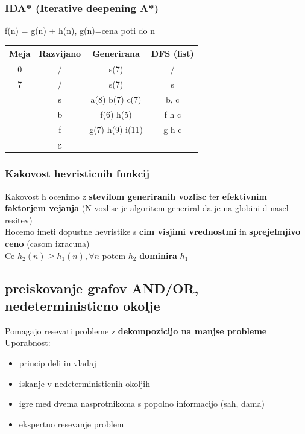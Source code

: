 \subsubsection{IDA* (Iterative deepening A*)}
f(n) = g(n) + h(n), g(n)=cena poti do n\\
\begin{tabular}{c|c|c|c}
    Meja & Razvijano & Generirana & DFS (list)\\
    \hline
    0 & / & s(7) & /\\
    \hline
    7 & / & s(7) & s \\
      & s & a(8) b(7) c(7) & b, c\\
      & b & f(6) h(5) & f h c\\
      & f & g(7) h(9) i(11) & g h c\\
      & \underline{g} &  & 
\end{tabular}



\subsubsection{Kakovost hevristicnih funkcij}

Kakovost h ocenimo z \textbf{stevilom generiranih vozlisc} ter \textbf{efektivnim faktorjem vejanja} (N vozlisc je algoritem generiral da je na globini d nasel resitev)\\
Hocemo imeti dopustne hevristike s \textbf{cim visjimi vrednostmi} in \textbf{sprejelmjivo ceno} (casom izracuna)\\
Ce $h_2(n) \geq h_1(n), \forall n$ potem $h_2$ \textbf{dominira} $h_1$\\


\subsection{preiskovanje grafov AND/OR, nedeterministicno okolje}
Pomagajo resevati probleme z \textbf{dekompozicijo na manjse probleme}
Uporabnost:
\begin{itemize}[noitemsep,topsep=0pt,leftmargin=*]
    \item princip deli in vladaj
    \item iskanje v nedeterministicnih okoljih 
    \item igre med dvema nasprotnikoma s popolno informacijo (sah, dama)
    \item ekspertno resevanje problem
\end{itemize}
